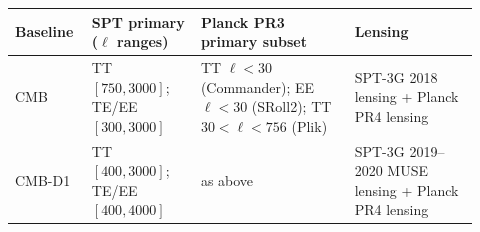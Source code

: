 \begin{tabular}{@{} p{0.14\linewidth} p{0.22\linewidth} p{0.31\linewidth} p{0.25\linewidth} @{}}
\toprule
Baseline & SPT primary ($\ell$ ranges) & Planck PR3 primary subset & Lensing \\
\midrule
CMB & TT $[750,3000]$; TE/EE $[300,3000]$ & TT $\ell<30$ (Commander); EE $\ell<30$ (SRoll2); TT $30<\ell<756$ (Plik) & SPT-3G 2018 lensing + Planck PR4 lensing \\
\addlinespace
CMB-D1 & TT $[400,3000]$; TE/EE $[400,4000]$ & as above & SPT-3G 2019--2020 MUSE lensing + Planck PR4 lensing \\
\bottomrule
\end{tabular}
